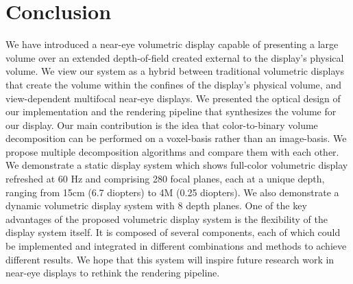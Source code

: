 \section{Conclusion}
We have introduced a near-eye volumetric display capable of presenting a large volume over an extended depth-of-field created external to the display's physical volume. We view our system as a hybrid between traditional volumetric displays that create the volume within the confines of the display's physical volume, and view-dependent multifocal near-eye displays. We presented the optical design of our implementation and the rendering pipeline that synthesizes the volume for our display. 
Our main contribution is the idea that color-to-binary volume decomposition can be performed on a voxel-basis rather than an image-basis. 
We propose multiple decomposition algorithms and compare them with each other. 
We demonstrate a static display system which shows full-color volumetric display refreshed at 60 Hz and comprising 280 focal planes, each at a unique depth, ranging from 15cm (6.7 diopters) to 4M (0.25 diopters). 
We also demonstrate a dynamic volumetric display system with 8 depth planes. 
One of the key advantages of the proposed volumetric display system is the flexibility of the display system itself. 
It is composed of several components, each of which could be implemented and integrated in different combinations and methods to achieve different results. 
We hope that this system will inspire future research work in near-eye displays to rethink the rendering pipeline. 


